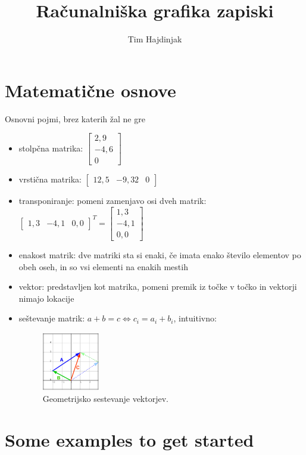 \documentclass{article}
\title{Računalniška grafika zapiski}
\author{Tim Hajdinjak}
\begin{document}
\maketitle

\section{Matematične osnove}

Osnovni pojmi, brez katerih žal ne gre

\begin{itemize}
\item stolpčna matrika: $\begin{bmatrix} 2,9 \\ -4,6 \\ 0 \end{bmatrix}$
\item vrstična matrika:  $\begin{bmatrix} 12,5 & -9,32 & 0 \end{bmatrix}$
\item transponiranje: pomeni zamenjavo osi dveh matrik: $\begin{bmatrix} 1,3 & -4,1 & 0,0 \end{bmatrix}^T = \begin{bmatrix} 1,3 \\ -4,1 \\ 0,0 \end{bmatrix}$
\item enakost matrik: dve matriki sta si enaki, če imata enako število elementov po obeh oseh, in so vsi elementi na enakih mestih
\item vektor: predstavljen kot matrika, pomeni premik iz točke v točko in vektorji nimajo lokacije
\item seštevanje matrik: $a + b = c \iff c_i = a_i + b_i$, intuitivno: 
\begin{figure}[H]
\centering
\includegraphics[width=25mm]{sestevanje_vektorjev.png}
\caption{Geometrijsko sestevanje vektorjev.}
\end{figure}
\end{itemize}

\section{Some examples to get started}
\end{document}
